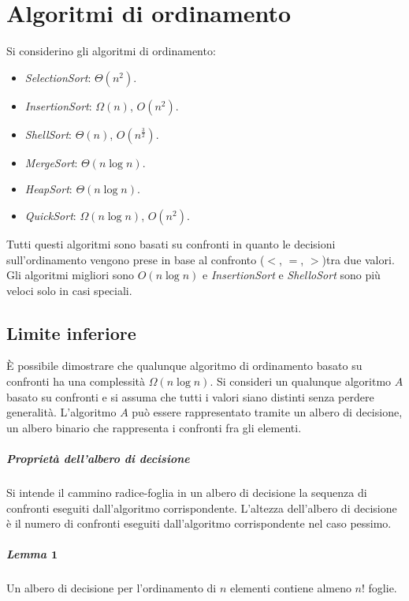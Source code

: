 \chapter{Algoritmi di ordinamento}
Si considerino gli algoritmi di ordinamento:
\begin{multicols}{2}
	\begin{itemize}
		\item \emph{SelectionSort}: $\Theta(n^2)$.
		\item \emph{InsertionSort}: $\Omega(n)$, $O(n^2)$.
		\item \emph{ShellSort}: $\Theta(n)$, $O(n^\frac{3}{2})$.
		\item \emph{MergeSort}: $\Theta(n\log n)$.
		\item \emph{HeapSort}: $\Theta(n\log n)$.
		\item \emph{QuickSort}: $\Omega(n\log n)$, $O(n^2)$.
	\end{itemize}
\end{multicols}
Tutti questi algoritmi sono basati su confronti in quanto le decisioni sull'ordinamento vengono prese in base al confronto ($<$, $=$, $>$)tra due valori. Gli algoritmi migliori sono
$O(n\log n)$ e \emph{InsertionSort} e \emph{ShelloSort} sono pi\`u veloci solo in casi speciali. 
\section{Limite inferiore}
\`E possibile dimostrare che qualunque algoritmo di ordinamento basato su confronti ha una complessit\`a $\Omega(n\log n)$. Si consideri un qualunque algoritmo $A$ basato su confronti e
si assuma che tutti i valori siano distinti senza perdere generalit\`a. L'algoritmo $A$ pu\`o essere rappresentato tramite un albero di decisione, un albero binario che rappresenta i 
confronti fra gli elementi. 
\paragraph{Propriet\`a dell'albero di decisione}
Si intende il cammino radice-foglia in un albero di decisione la sequenza di confronti eseguiti dall'algoritmo corrispondente. L'altezza dell'albero di decisione \`e il numero di 
confronti eseguiti dall'algoritmo corrispondente nel caso pessimo. 
\paragraph{Lemma $\mathbf{1}$}
Un albero di decisione per l'ordinamento di $n$ elementi contiene almeno $n!$ foglie. 
